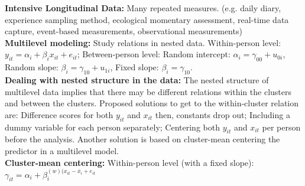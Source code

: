 \documentclass[a4paper,7pt,landscape]{extarticle}
\begin{document}
\begin{multicols}{3}
\begin{boxA}
\textbf{Intensive Longitudinal Data:} Many repeated measures. (e.g. daily diary, experience sampling method, ecological momentary assessment, real-time data capture, event-based measurements, observational measurements)\\
\textbf{Multilevel modeling:} Study relations in nested data. Within-person level: $y_{it} = \alpha_i + \beta_i x_{it} + e_{it}$; Between-person level: Random intercept: $\alpha_i = \gamma_{00} + u_{0i}$, Random slope: $\beta_i = \gamma_{10} + u_{1i}$, Fixed slope: $\beta_i = \gamma_{10}$.\\
\textbf{Dealing with nested structure in the data:} The nested structure of multilevel data implies that there may be different relations within the clusters and between the clusters. Proposed solutions to get to the within-cluster relation are: Difference scores for both $y_{it}$ and $x_{it}$ then, constants drop out; Including a dummy variable for each person separately; Centering both $y_{it}$ and $x_{it}$ per person before the analysis. Another solution is based on cluster-mean centering the predictor in a multilevel model.\\
\textbf{Cluster-mean centering:} Within-person level (with a fixed slope): $\gamma_{it} = \alpha_i + \beta_i^{(w) (x_{it}-\overline{x}_{i} + e_{it}}$\\


\end{boxA}


\end{multicols}
\end{document}
